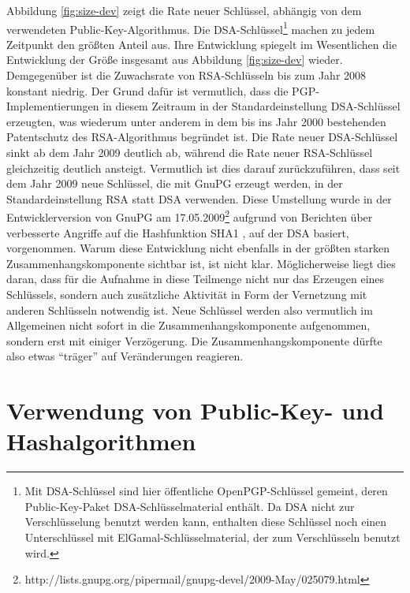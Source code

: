 Abbildung \ref{fig:size-dev} zeigt die Rate neuer Schlüssel,
abhängig von dem verwendeten Public-Key-Algorithmus. Die
DSA-Schlüssel\footnote{Mit DSA-Schlüssel sind hier öffentliche
  OpenPGP-Schlüssel gemeint, deren Public-Key-Paket
  DSA-Schlüsselmaterial enthält. Da DSA nicht zur
  Verschlüsselung benutzt werden kann, enthalten diese Schlüssel
  noch einen Unterschlüssel mit ElGamal-Schlüsselmaterial, der zum
  Verschlüsseln benutzt wird.} machen zu jedem Zeitpunkt den
größten Anteil aus. Ihre Entwicklung spiegelt im Wesentlichen die
Entwicklung der Größe insgesamt aus Abbildung \ref{fig:size-dev}
wieder. Demgegenüber ist die Zuwachsrate von RSA-Schlüsseln bis
zum Jahr 2008 konstant niedrig. Der Grund dafür ist vermutlich, dass
die PGP-Implementierungen in diesem Zeitraum in der
Standardeinstellung DSA-Schlüssel erzeugten, was wiederum unter
anderem in dem bis ins Jahr 2000 bestehenden Patentschutz des
RSA-Algorithmus begründet ist.  Die Rate neuer DSA-Schlüssel sinkt
ab dem Jahr 2009 deutlich ab, während die Rate neuer RSA-Schlüssel
gleichzeitig deutlich ansteigt. Vermutlich ist dies darauf
zurückzuführen, dass seit dem Jahr 2009 neue Schlüssel, die mit
GnuPG erzeugt werden, in der Standardeinstellung RSA statt DSA
verwenden. Diese Umstellung wurde in der Entwicklerversion von GnuPG
am
17.05.2009\footnote{http://lists.gnupg.org/pipermail/gnupg-devel/2009-May/025079.html}
aufgrund von Berichten über verbesserte Angriffe auf die
Hashfunktion SHA1 \cite{McDonald2009}, auf der DSA basiert,
vorgenommen. Warum diese Entwicklung nicht ebenfalls in der größten
starken Zusammenhangskomponente sichtbar ist, ist nicht
klar. Möglicherweise liegt dies daran, dass für die Aufnahme in
diese Teilmenge nicht nur das Erzeugen eines Schlüssels, sondern
auch zusätzliche Aktivität in Form der Vernetzung mit anderen
Schlüsseln notwendig ist. Neue Schlüssel werden also vermutlich im
Allgemeinen nicht sofort in die Zusammenhangskomponente aufgenommen,
sondern erst mit einiger Verzögerung. Die Zusammenhangskomponente
dürfte also etwas "`träger"' auf Veränderungen reagieren.

\section{Verwendung von Public-Key- und Hashalgorithmen}
\label{sec:public-key-und}

